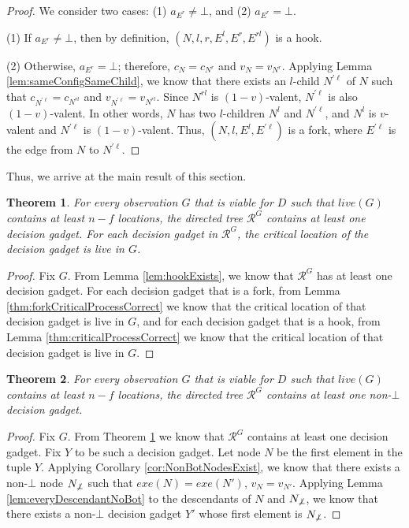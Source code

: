 \documentclass[11pt]{article}
\newtheorem{theorem}{Theorem}
\numberwithin{theorem}{section}
\begin{document}
\begin{proof}
We consider two cases: (1) $a_{E^r} \neq \bot$, and (2)  $a_{E^r} = \bot$.

(1) If $a_{E^r} \neq \bot$, then by definition, $(N,l,r,E^l,E^r,E^{rl})$ is a hook. 

(2) Otherwise, $a_{E^r} = \bot$; therefore, $c_N = c_{N^r}$ and $v_N = v_{N^r}$. Applying Lemma \ref{lem:sameConfigSameChild}, we know that there exists an $l$-child  $N^{\prime \ell}$ of $N$ such that $c_{N^{\prime \ell}} = c_{N^{rl}}$ and $v_{N^{\prime \ell}} = v_{N^{rl}}$. Since $N^{rl}$ is $(1-v)$-valent, $N^{\prime \ell}$ is also $(1-v)$-valent. In other words, $N$ has two $l$-children $N^l$ and $N^{\prime \ell}$, and $N^l$ is $v$-valent and $N^{\prime \ell}$ is $(1-v)$-valent. 
Thus, $(N,l,E^l, E^{\prime \ell})$ is a fork, where $E^{\prime \ell}$ is the edge from $N$ to $N^{\prime \ell}$.
\end{proof}


Thus, we arrive at the main result of this section.


\begin{theorem}\label{thm:ViableGHasDecisionGadgets}
 For every observation $G$ that is viable for $D$ such that $live(G)$ contains at least $n-f$ locations, the directed tree $\mathcal{R}^G$ contains at least one decision gadget. For each decision  gadget in $\mathcal{R}^G$, the critical location of the decision gadget is live in $G$.
\end{theorem}
\begin{proof}
 Fix $G$. From Lemma \ref{lem:hookExists}, we know that $\mathcal{R}^G$ has at least one decision gadget. For each decision gadget that is a fork, from Lemma \ref{thm:forkCriticalProcessCorrect} we know that the critical location of that decision gadget is live in $G$, and for each decision gadget that is a hook, from Lemma \ref{thm:criticalProcessCorrect} we know that the critical location of that decision gadget is live in $G$.
\end{proof}

\begin{theorem}\label{thm:ViableGHasNonBotDecisionGadgets}
For every observation $G$ that is viable for $D$ such that $live(G)$ contains at least $n-f$ locations, the directed tree $\mathcal{R}^G$ contains at least one non-$\bot$ decision gadget.
\end{theorem}
\begin{proof}
Fix $G$. From Theorem \ref{thm:ViableGHasDecisionGadgets} we know that $\mathcal{R}^G$ contains at least one decision gadget. Fix $Y$ to be such a decision gadget. Let node $N$ be the first element in the tuple $Y$. Applying Corollary \ref{cor:NonBotNodesExist}, we know that there exists a non-$\bot$ node $N_{\not\bot}$ such that $exe(N) = exe(N')$, $v_N = v_{N'}$. Applying Lemma \ref{lem:everyDescendantNoBot} to the descendants of $N$ and $N_{\not\bot}$, we know that there exists a non-$\bot$ decision gadget $Y'$ whose first element is $N_{\not\bot}$.
\end{proof}
\end{document}
